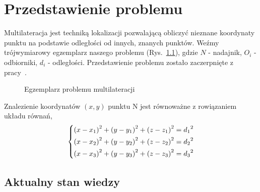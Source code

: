 \chapter{Przedstawienie problemu}\label{chap:problem}

Multilateracja jest techniką lokalizacji pozwalającą obliczyć nieznane koordynaty punktu na podstawie odległości od innych, znanych punktów. Weźmy trójwymiarowy egzemplarz naszego problemu (Rys.~\ref{fig:example}), gdzie $N$ - nadajnik, $O_i$ - odbiorniki, $d_i$ - odległości. Przedstawienie problemu zostało zaczerpnięte z pracy~\cite{norrdine2012algebraic}.

\begin{figure}[!h]
    \centering
    \caption{Egzemplarz problemu multilateracji}
\label{fig:example}
\end{figure}

Znalezienie koordynatów $(x,y)$ punktu N jest równoważne z rowiązaniem układu równań,
\begin{equation}\label{eq:base}
    \begin{dcases}
        {(x - x_1)}^2 + {(y - y_1)}^2 + {(z - z_1)}^2 = {d_1}^2\\
        {(x - x_2)}^2 + {(y - y_2)}^2 + {(z - z_2)}^2 = {d_2}^2\\
        {(x - x_3)}^2 + {(y - y_3)}^2 + {(z - z_3)}^2 = {d_3}^2\\
    \end{dcases}
\end{equation}

\section{Aktualny stan wiedzy}

